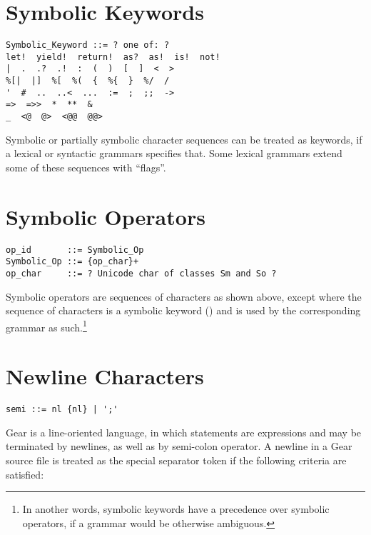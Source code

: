 \section{Symbolic Keywords}
\label{sec:symbolic-keywords}

\syntax\begin{lstlisting}[deletekeywords={of}]
Symbolic_Keyword ::= ? one of: ?
let!  yield!  return!  as?  as!  is!  not!
|  .  .?  .!  :  (  )  [  ]  <  >  
%[|  |]  %[  %(  {  %{  }  %/  /
'  #  ..  ..<  ...  :=  ;  ;;  ->  
=>  =>>  *  **  &
_  <@  @>  <@@  @@>
\end{lstlisting}

Symbolic or partially symbolic character sequences can be treated as keywords, if a lexical or syntactic grammars specifies that. Some lexical grammars extend some of these sequences with ``flags''. 





\section{Symbolic Operators}
\label{sec:symbolic-operators}

\syntax\begin{lstlisting}[deletekeywords={of,and}]
op_id       ::= Symbolic_Op
Symbolic_Op ::= {op_char}+
op_char     ::= ? Unicode char of classes Sm and So ?
\end{lstlisting}

Symbolic operators are sequences of characters as shown above, except where the sequence of characters is a symbolic keyword () and is used by the corresponding grammar as such.\footnote{In another words, symbolic keywords have a precedence over symbolic operators, if a grammar would be otherwise ambiguous.}





\section{Newline Characters}
\label{sec:newlinecharacters}

\syntax\begin{lstlisting}
semi ::= nl {nl} | ';'
\end{lstlisting}

Gear is a line-oriented language, in which statements are expressions and may be terminated by newlines, as well as by semi-colon operator. A newline in a Gear source file is treated as the special separator token \lstinline@nl@ if the following criteria are satisfied:

